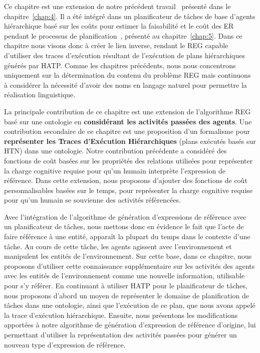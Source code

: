 Ce chapitre est une extension de notre précédent travail~\cite{buisan_2020_efficient} présenté dans le chapitre~\ref{chap:4}. Il a été intégré dans un planificateur de tâches de base d'agents hiérarchique basé sur les coûts pour estimer la faisabilité et le coût des ER pendant le processus de planification~\cite{buisan_2020_human}, présenté au chapitre~\ref{chap:5}. Dans ce chapitre nous visons donc à créer le lien inverse, rendant le REG capable d'utiliser des traces d'exécution résultant de l'exécution de plans hiérarchiques générés par HATP. Comme les chapitres précédents, nous nous concentrons uniquement sur la détermination du contenu du problème REG mais continuons à considérer la nécessité d'avoir des noms en langage naturel pour permettre la réalisation linguistique.

La principale contribution de ce chapitre est une extension de l'algorithme REG basé sur une ontologie en \textbf{considérant les activités passées des agents}. Une contribution secondaire de ce chapitre est une proposition d'un formalisme pour \textbf{représenter les Traces d'Exécution Hiérarchiques} (plans exécutés basés sur HTN) dans une ontologie. Notre contribution précédente a considéré des fonctions de coût basées sur les propriétés des relations utilisées pour représenter la charge cognitive requise pour qu'un humain interprète l'expression de référence. Dans cette extension, nous proposons d'ajouter des fonctions de coût personnalisables basées sur le temps, pour représenter la charge cognitive requise pour qu'un humain se souvienne des activités référencées. 

Avec l'intégration de l'algorithme de génération d'expressions de référence avec un planificateur de tâches, nous mettons donc en évidence le fait que l'acte de faire référence à une entité, apparaît la plupart du temps dans le contexte d'une tâche. Au cours de cette tâche, les agents agissent avec l'environnement et manipulent les entités de l'environnement. Sur cette base, dans ce chapitre, nous proposons d'utiliser cette connaissance supplémentaire sur les activités des agents avec les entités de l'environnement comme une nouvelle information, utilisable pour s'y référer. En continuant à utiliser HATP pour le planificateur de tâches, nous proposons d'abord un moyen de représenter le domaine de planification de tâches dans une ontologie, ainsi que l'exécution de ce plan, que nous avons appelé la trace d'exécution hiérarchique. Ensuite, nous présentons les modifications apportées à notre algorithme de génération d'expression de référence d'origine, lui permettant d'utiliser la représentation des activités passées pour générer un nouveau type d'expression de référence. 

